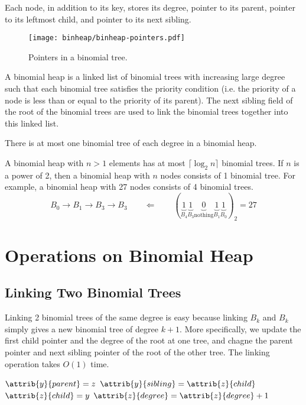 Each node, in addition to its key, stores its degree, pointer to its parent, pointer to its leftmost child, and pointer to its next sibling.

\begin{figure}[htbp]
    \centering
    \texttt{[image: binheap/binheap-pointers.pdf]}
    \caption{Pointers in a binomial tree.}
    \label{fig:binheap-pointers}
\end{figure}

A binomial heap is a linked list of binomial trees with increasing large degree such that each binomial tree satisfies the priority condition (i.e. the priority of a node is less than or equal to the priority of its parent). The next sibling field of the root of the binomial trees are used to link the binomial trees together into this linked list.

There is at most one binomial tree of each degree in a binomial heap. 

A binomial heap with $n>1$ elements has at most $\lceil \log_2 n \rceil$ binomial trees. If $n$ is a power of 2, then a binomial heap with $n$ nodes consists of 1 binomial tree. For example, a binomial heap with 27 nodes consists of 4 binomial trees.
$$
B_0 \to B_1 \to B_3 \to B_3 \qquad \Leftarrow \qquad \left({\underbrace{1}_{B_4} \underbrace{1}_{B_3} \underbrace{0}_{\text{nothing}} \underbrace{1}_{B_1} \underbrace{1}_{B_0}}\right)_2 = 27
$$

\section{Operations on Binomial Heap}

\subsection{Linking Two Binomial Trees}

Linking 2 binomial trees of the same degree is easy because linking $B_k$ and $B_k$ simply gives a new binomial tree of degree $k+1$. More specifically, we update the first child pointer and the degree of the root at one tree, and chagne the parent pointer and next sibling pointer of the root of the other tree. The linking operation takes $O(1)$ time.

\begin{codebox}
    \li $\attrib{y}{parent} = z$
    \li $\attrib{y}{sibling} = \attrib{z}{child}$
    \li $\attrib{z}{child} = y$
    \li $\attrib{z}{degree} = \attrib{z}{degree} + 1$    
\end{codebox}

